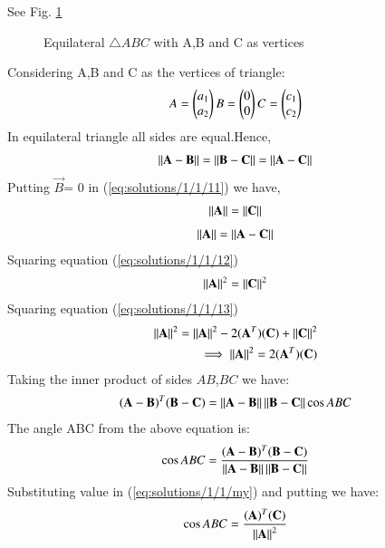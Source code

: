 See Fig. \ref{fig:solutions/1/1tri_right_angle}

\begin{figure}[!ht]
\centering
\resizebox{\columnwidth}{!}{}
\caption{Equilateral $\triangle{ABC}$ with A,B and C as vertices}
\label{fig:solutions/1/1tri_right_angle}
\end{figure}
Considering A,B and C as the vertices of triangle:
\begin{align}
   A=
\begin{pmatrix}
a_1\\
a_2
\end{pmatrix}
B=
\begin{pmatrix}
0\\
0
\end{pmatrix}
C=
\begin{pmatrix}
c_1\\
c_2
\end{pmatrix} \nonumber
\end{align}
In equilateral triangle all sides are equal.Hence,
\begin{align}\label{eq:solutions/1/1/11}
\left\lVert\mathbf{A-B}\right\rVert = \left\lVert\mathbf{B-C}\right\rVert = \left\lVert\mathbf{A-C}\right\rVert
\end{align}
Putting $\vec{B}$= 0 in (\ref {eq:solutions/1/1/11}) we have,
\begin{align}
\label{eq:solutions/1/1/12}
\left\lVert\mathbf{A}\right\rVert=\left\lVert\mathbf{C}\right\rVert
\end{align}
\begin{align}
\label{eq:solutions/1/1/13}
\left\lVert\mathbf{A}\right\rVert=\left\lVert\mathbf{A-C}\right\rVert
\end{align}
Squaring  equation (\ref{eq:solutions/1/1/12})
 \begin{align}
\label{eq:solutions/1/1/17}
\left\lVert\mathbf{A}\right\rVert^2=\left\lVert\mathbf{C}\right\rVert^2
\end{align}
Squaring  equation (\ref{eq:solutions/1/1/13})
 \begin{align}
\label{eq:solutions/1/1/14}
\left\lVert\mathbf{A}\right\rVert^2=\left\lVert\mathbf{A}\right\rVert^2 - 2(\mathbf{A}^T )(\mathbf{C}) +\left\lVert\mathbf{C}\right\rVert^2 \nonumber \\
\implies \left\lVert\mathbf{A}\right\rVert^2=2(\mathbf{A}^T )(\mathbf{C})
\end{align}
Taking the inner product of sides $AB$,$BC$ we have:
\begin{align}
    (\mathbf{A}-\mathbf{B})^T(\mathbf{B}-\mathbf{C}) =
    \left\lVert\mathbf{A}-\mathbf{B}\right\rVert\left\lVert\mathbf{B}-\mathbf{C}\right\rVert\cos{ABC}
\end{align}
The angle ABC from the  above equation is:
\begin{align}\label{eq:solutions/1/1/my}
     \cos{ABC} = \frac{(\mathbf{A}-\mathbf{B})^T(\mathbf{B}-\mathbf{C})}{\left\lVert\mathbf{A}-\mathbf{B}\right\rVert\left\lVert\mathbf{B}-\mathbf{C}\right\rVert} 
\end{align}
Substituting value in (\ref{eq:solutions/1/1/my}) and putting we have:
\begin{align}\label{eq:solutions/1/1/my1}
     \cos{ABC} = \frac{(\mathbf{A})^T(\mathbf{C})}{\left\lVert\mathbf{A}\right\rVert^2}
\end{align}
